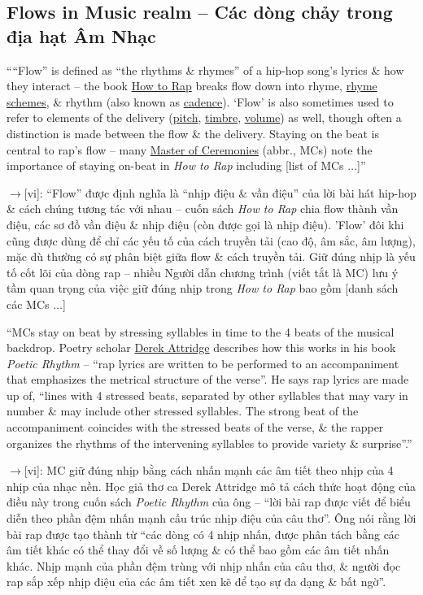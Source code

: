 \documentclass[12pt,twoside]{book}
\begin{document}
\subsection{Flows in Music realm -- Các dòng chảy trong địa hạt Âm Nhạc}
````Flow'' is defined as ``the rhythms \& rhymes'' of a hip-hop song's lyrics \& how they interact -- the book \href{https://en.wikipedia.org/wiki/How_to_Rap}{How to Rap} breaks flow down into rhyme, \href{https://en.wikipedia.org/wiki/Rhyme_scheme}{rhyme schemes}, \& rhythm (also known as \href{https://en.wikipedia.org/wiki/Cadence_(music)}{cadence}). `Flow' is also sometimes used to refer to elements of the delivery (\href{https://en.wikipedia.org/wiki/Pitch_(music)}{pitch}, \href{https://en.wikipedia.org/wiki/Timbre}{timbre}, \href{https://en.wikipedia.org/wiki/Loudness}{volume}) as well, though often a distinction is made between the flow \& the delivery. Staying on the beat is central to rap's flow -- many \href{https://en.wikipedia.org/wiki/Master_of_Ceremonies#Hip_hop}{Master of Ceremonies} (abbr., MCs)  note the importance of staying on-beat in {\it How to Rap} including [list of MCs $\ldots$]''

{\sf[en]$\to$[vi]}: ``Flow'' được định nghĩa là ``nhịp điệu \& vần điệu'' của lời bài hát hip-hop \& cách chúng tương tác với nhau -- cuốn sách {\it How to Rap} chia flow thành vần điệu, các sơ đồ vần điệu \& nhịp điệu (còn được gọi là nhịp điệu). 'Flow' đôi khi cũng được dùng để chỉ các yếu tố của cách truyền tải (cao độ, âm sắc, âm lượng), mặc dù thường có sự phân biệt giữa flow \& cách truyền tải. Giữ đúng nhịp là yếu tố cốt lõi của dòng rap -- nhiều Người dẫn chương trình (viết tắt là MC) lưu ý tầm quan trọng của việc giữ đúng nhịp trong {\it How to Rap} bao gồm [danh sách các MCs $\ldots$]

``MCs stay on beat by stressing syllables in time to the 4 beats of the musical backdrop. Poetry scholar \href{https://en.wikipedia.org/wiki/Derek_Attridge}{\sc Derek Attridge} describes how this works in his book {\it Poetic Rhythm} -- ``rap lyrics are written to be performed to an accompaniment that emphasizes the metrical structure of the verse''. He says rap lyrics are made up of, ``lines with 4 stressed beats, separated by other syllables that may vary in number \& may include other stressed syllables. The strong beat of the accompaniment coincides with the stressed beats of the verse, \& the rapper organizes the rhythms of the intervening syllables to provide variety \& surprise''.''

{\sf[en]$\to$[vi]}: MC giữ đúng nhịp bằng cách nhấn mạnh các âm tiết theo nhịp của 4 nhịp của nhạc nền. Học giả thơ ca {\sc Derek Attridge} mô tả cách thức hoạt động của điều này trong cuốn sách {\it Poetic Rhythm} của ông -- ``lời bài rap được viết để biểu diễn theo phần đệm nhấn mạnh cấu trúc nhịp điệu của câu thơ''. Ông nói rằng lời bài rap được tạo thành từ ``các dòng có 4 nhịp nhấn, được phân tách bằng các âm tiết khác có thể thay đổi về số lượng \& có thể bao gồm các âm tiết nhấn khác. Nhịp mạnh của phần đệm trùng với nhịp nhấn của câu thơ, \& người đọc rap sắp xếp nhịp điệu của các âm tiết xen kẽ để tạo sự đa dạng \& bất ngờ''.
\end{document}

